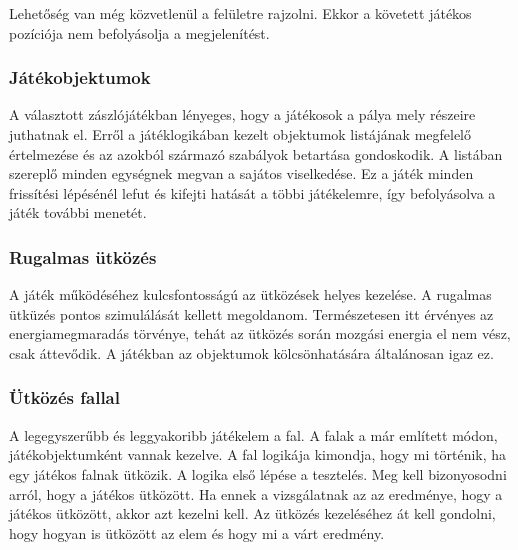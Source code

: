 \documentclass[bibliography=totocnumbered]{article}
\begin{document}
Lehetőség van még közvetlenül a felületre rajzolni. Ekkor a követett
játékos pozíciója nem befolyásolja a megjelenítést.


\subsubsection{Játékobjektumok}

A választott zászlójátékban lényeges, hogy a játékosok a pálya mely
részeire juthatnak el. Erről a játéklogikában kezelt objektumok
listájának megfelelő értelmezése és az azokból származó szabályok
betartása gondoskodik. A listában szereplő minden egységnek megvan a
sajátos viselkedése. Ez a játék minden frissítési lépésénél lefut és
kifejti hatását a többi játékelemre, így befolyásolva a játék további
menetét.


\subsubsection{Rugalmas ütközés}

A játék működéséhez kulcsfontosságú az ütközések helyes kezelése. A
rugalmas ütküzés pontos szimulálását kellett megoldanom. Természetesen
itt érvényes az energiamegmaradás törvénye, tehát az ütközés során
mozgási energia el nem vész, csak áttevődik. A játékban az objektumok
kölcsönhatására általánosan igaz ez.


\subsubsection{Ütközés fallal}

A legegyszerűbb és leggyakoribb játékelem a fal. A falak a már említett
módon, játékobjektumként vannak kezelve. A fal logikája kimondja, hogy
mi történik, ha egy játékos falnak ütközik. A logika első lépése a
tesztelés. Meg kell bizonyosodni arról, hogy a játékos ütközött. Ha
ennek a vizsgálatnak az az eredménye, hogy a játékos ütközött, akkor azt
kezelni kell. Az ütközés kezeléséhez át kell gondolni, hogy hogyan is
ütközött az elem és hogy mi a várt eredmény.
\end{document}

